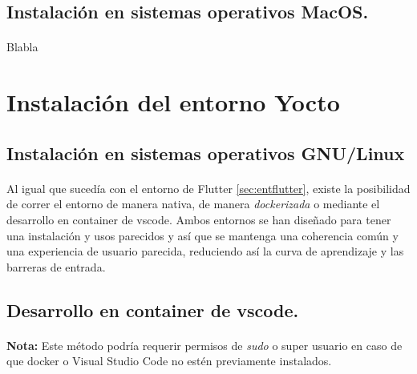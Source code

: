 \subsection{Instalación en sistemas operativos MacOS.}

\paragraph{}Blabla

\newpage

\section{Instalación del entorno Yocto}

\subsection{Instalación en sistemas operativos GNU/Linux}

\paragraph{}Al igual que sucedía con el entorno de Flutter \ref{sec:entflutter}, existe
la posibilidad de correr el entorno de manera nativa, de manera \emph{dockerizada} o
mediante el desarrollo en container de \gls{vscode}.
Ambos entornos se han diseñado para tener una instalación y usos parecidos y así que
se mantenga una coherencia común y una experiencia de usuario parecida, reduciendo así
la curva de aprendizaje y las barreras de entrada.

\subsection{Desarrollo en container de vscode.}

\paragraph{}\textbf{Nota:} Este método podría requerir permisos de \emph{sudo} o super
usuario en caso de que docker o Visual Studio Code no estén previamente instalados.

